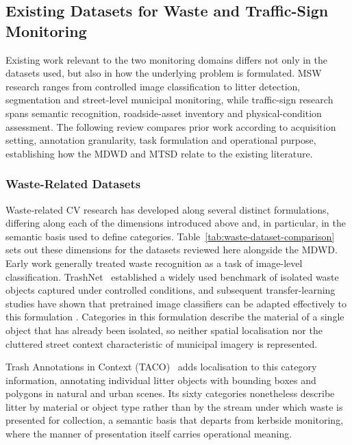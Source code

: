 \subsection{Existing Datasets for Waste and Traffic-Sign Monitoring}
\label{sec:bg-related-datasets}
Existing work relevant to the two monitoring domains differs not only in the datasets used, but also in how the underlying problem is formulated. \gls{MSW} research ranges from controlled image classification to litter detection, segmentation and street-level municipal monitoring, while traffic-sign research spans semantic recognition, roadside-asset inventory and physical-condition assessment. The following review compares prior work according to acquisition setting, annotation granularity, task formulation and operational purpose, establishing how the \gls{MDWD} and \gls{MTSD} relate to the existing literature.

\subsubsection{Waste-Related Datasets}
\label{sec:bg-waste-datasets}
Waste-related \gls{CV} research has developed along several distinct formulations, differing along each of the dimensions introduced above and, in particular, in the semantic basis used to define categories. Table~\ref{tab:waste-dataset-comparison} sets out these dimensions for the datasets reviewed here alongside the \gls{MDWD}. Early work generally treated waste recognition as a task of image-level classification. TrashNet~\cite{trashnet} established a widely used benchmark of isolated waste objects captured under controlled conditions, and subsequent transfer-learning studies have shown that pretrained image classifiers can be adapted effectively to this formulation \cite{jain2024mobilenetbags,jain2024resnetbags}. Categories in this formulation describe the material of a single object that has already been isolated, so neither spatial localisation nor the cluttered street context characteristic of municipal imagery is represented.

Trash Annotations in Context (TACO)~\cite{proenca2020taco} adds localisation to this category information, annotating individual litter objects with bounding boxes and polygons in natural and urban scenes. Its sixty categories nonetheless describe litter by material or object type rather than by the stream under which waste is presented for collection, a semantic basis that departs from kerbside monitoring, where the manner of presentation itself carries operational meaning.

